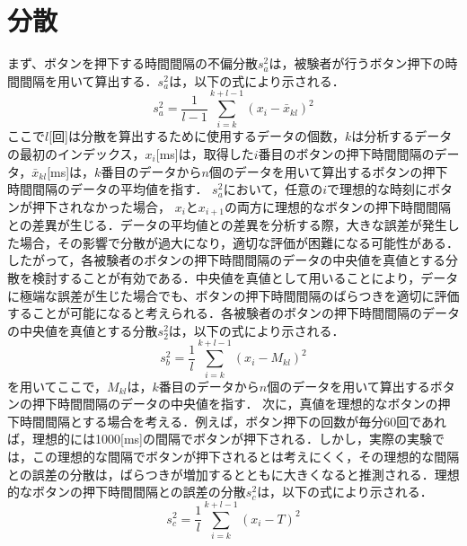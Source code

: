 \section{分散}
まず、ボタンを押下する時間間隔の不偏分散$s^2_{a}$は，被験者が行うボタン押下の時間間隔を用いて算出する．$s^2_{a}$は，以下の式により示される．
\begin{equation}
  s^2_a = \frac{1}{l-1} \sum_{i=k}^{k+l-1} (x_i - \bar{x}_{kl})^2
\end{equation}
ここで$l$[回]は分散を算出するために使用するデータの個数，$k$は分析するデータの最初のインデックス，$x_{i}$[ms]は，取得した$i$番目のボタンの押下時間間隔のデータ，$\bar{x}_{kl}$[ms]は，$k$番目のデータから$n$個のデータを用いて算出するボタンの押下時間間隔のデータの平均値を指す．
$s^2_{a}$において，任意の$i$で理想的な時刻にボタンが押下されなかった場合，
$x_{i}$と$x_{i+1}$の両方に理想的なボタンの押下時間間隔との差異が生じる．データの平均値との差異を分析する際，大きな誤差が発生した場合，その影響で分散が過大になり，適切な評価が困難になる可能性がある．したがって，各被験者のボタンの押下時間間隔のデータの中央値を真値とする分散を検討することが有効である．中央値を真値として用いることにより，データに極端な誤差が生じた場合でも、ボタンの押下時間間隔のばらつきを適切に評価することが可能になると考えられる．各被験者のボタンの押下時間間隔のデータの中央値を真値とする分散$s^2_{2}$は，以下の式により示される．
\begin{equation}
  s^2_b = \frac{1}{l} \sum_{i=k}^{k+l-1} (x_i - M_{kl})^2
\end{equation}
を用いてここで，$M_{kl}$は，$k$番目のデータから$n$個のデータを用いて算出するボタンの押下時間間隔のデータの中央値を指す．
次に，真値を理想的なボタンの押下時間間隔とする場合を考える．例えば，ボタン押下の回数が毎分60回であれば，理想的には1000[ms]の間隔でボタンが押下される．しかし，実際の実験では，この理想的な間隔でボタンが押下されるとは考えにくく，その理想的な間隔との誤差の分散は，ばらつきが増加するとともに大きくなると推測される．理想的なボタンの押下時間間隔との誤差の分散$s^2_{c}$は，以下の式により示される．
\begin{equation}
  s^2_c = \frac{1}{l} \sum_{i=k}^{k+l-1} (x_i - T)^2
\end{equation}
